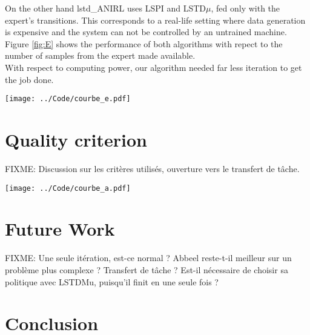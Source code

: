 \documentclass{article}
\begin{document}
On the other hand lstd\_ANIRL uses LSPI and LSTD$\mu$, fed only with the expert's transitions. This corresponds to a real-life setting where data generation is expensive and the system can not be controlled by an untrained machine.\\

Figure \ref{fig:E} shows the performance of both algorithms with repect to the number of samples from the expert made available.\\

With respect to computing power, our algorithm needed far less iteration to get the job done.
\begin{figure*}
\texttt{[image: ../Code/courbe\_e.pdf]}
\caption{$||\mu_E(s_0)-\mu_\pi(s_0)||_2$ with respect to the number of samples available from the expert. Our algorithm is not as good as \citet{abbeel2004apprenticeship} with very few samples, but make up for it very soon.}
\label{fig:E}
\end{figure*}
\section{Quality criterion}
FIXME: Discussion sur les critères utilisés, ouverture vers le transfert de tâche.
\begin{figure*}
\texttt{[image: ../Code/courbe\_a.pdf]}
\caption{Different criteria with respect to the number of iterations. See how decorelated they can be.}
\label{fig:A}
\end{figure*}
\section{Future Work}
FIXME: Une seule itération, est-ce normal ? Abbeel reste-t-il meilleur sur un problème plus complexe ? Transfert de tâche ? Est-il nécessaire de choisir sa politique avec LSTDMu, puisqu'il finit en une seule fois ?
\section{Conclusion}


\end{document}
